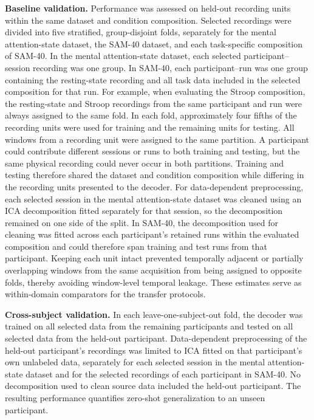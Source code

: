 \documentclass[10pt,letterpaper]{article}
\newcommand{\rev}[1]{#1}
\begin{document}
\textbf{Baseline validation.}
\rev{Performance was assessed on held-out recording units within the same dataset and condition composition. Selected recordings were divided into five stratified, group-disjoint folds, separately for the mental attention-state dataset, the SAM-40 dataset, and each task-specific composition of SAM-40. In the mental attention-state dataset, each selected participant--session recording was one group. In SAM-40, each participant--run was one group containing the resting-state recording and all task data included in the selected composition for that run. For example, when evaluating the Stroop composition, the resting-state and Stroop recordings from the same participant and run were always assigned to the same fold. In each fold, approximately four fifths of the recording units were used for training and the remaining units for testing. All windows from a recording unit were assigned to the same partition. A participant could contribute different sessions or runs to both training and testing, but the same physical recording could never occur in both partitions. Training and testing therefore shared the dataset and condition composition while differing in the recording units presented to the decoder. For data-dependent preprocessing, each selected session in the mental attention-state dataset was cleaned using an ICA decomposition fitted separately for that session, so the decomposition remained on one side of the split. In SAM-40, the decomposition used for cleaning was fitted across each participant's retained runs within the evaluated composition and could therefore span training and test runs from that participant. Keeping each unit intact prevented temporally adjacent or partially overlapping windows from the same acquisition from being assigned to opposite folds, thereby avoiding window-level temporal leakage. These estimates serve as within-domain comparators for the transfer protocols.}

\textbf{Cross-subject validation.}
\rev{In each leave-one-subject-out fold, the decoder was trained on all selected data from the remaining participants and tested on all selected data from the held-out participant. Data-dependent preprocessing of the held-out participant's recordings was limited to ICA fitted on that participant's own unlabeled data, separately for each selected session in the mental attention-state dataset and for the selected recordings of each participant in SAM-40. No decomposition used to clean source data included the held-out participant. The resulting performance quantifies zero-shot generalization to an unseen participant.}
\end{document}
